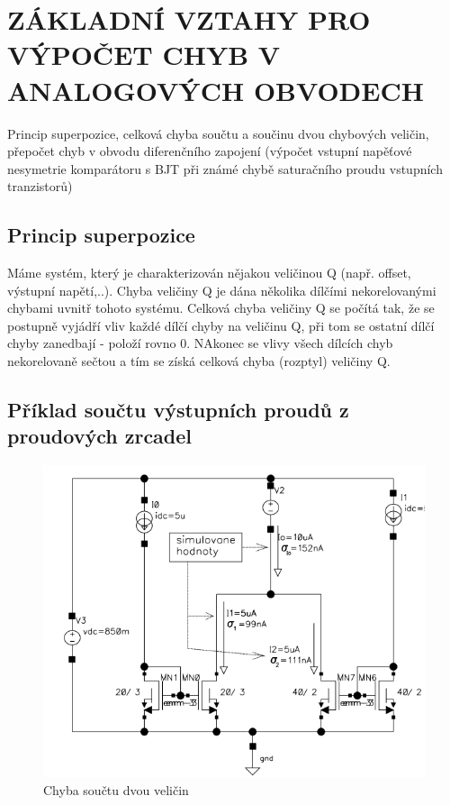 \section{ZÁKLADNÍ VZTAHY PRO VÝPOČET CHYB V ANALOGOVÝCH OBVODECH }
Princip superpozice, celková chyba součtu a součinu dvou chybových veličin, přepočet chyb v obvodu diferenčního zapojení (výpočet vstupní napěťové nesymetrie komparátoru s BJT při známé chybě saturačního proudu vstupních tranzistorů)

\subsection{Princip superpozice}
Máme systém, který je charakterizován nějakou veličinou Q (např. offset, výstupní napětí,..). Chyba veličiny Q je dána několika dílčími nekorelovanými chybami uvnitř tohoto systému. Celková chyba veličiny Q se počítá tak, že se postupně vyjádří vliv každé dílčí chyby na veličinu Q, při tom se ostatní dílčí chyby zanedbají - položí rovno 0. NAkonec se vlivy všech dílcích chyb nekorelovaně sečtou a tím se získá celková chyba (rozptyl) veličiny Q.

\subsection{Příklad součtu výstupních proudů z proudových zrcadel}

\begin{figure}[h]
   \begin{center}
     \includegraphics[scale=0.5]{images/Chyba_Souctu.png}
   \end{center}
   \caption{Chyba součtu dvou veličin}
\end{figure}

